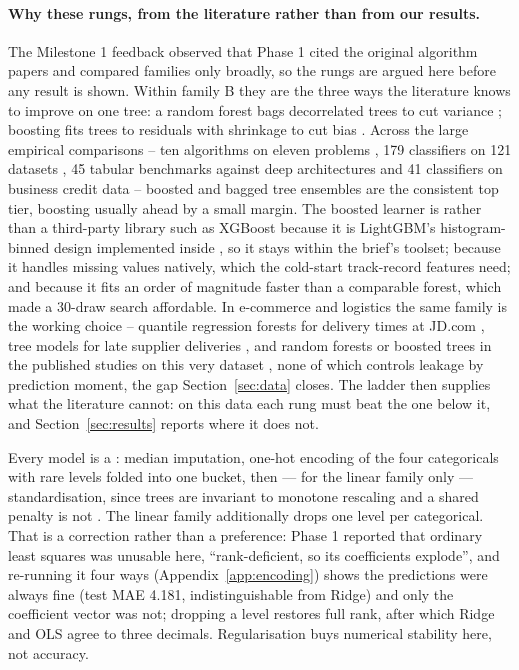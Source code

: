 \paragraph{Why these rungs, from the literature rather than from our results.}
The Milestone 1 feedback observed that Phase 1 cited the original algorithm
papers and compared families only broadly, so the rungs are argued here before
any result is shown. Within family B they are the three ways the literature
knows to improve on one tree: a random forest bags decorrelated trees to cut
variance \citep{breiman2001rf}; boosting fits trees to residuals with shrinkage
to cut bias \citep{friedman2001gbm}. Across the large empirical comparisons --
ten algorithms on eleven problems \citep{caruana2006empirical}, 179 classifiers
on 121 datasets \citep{fernandezdelgado2014hundreds}, 45 tabular benchmarks
against deep architectures \citep{grinsztajn2022tabular, shwartzziv2022tabular}
and 41 classifiers on business credit data \citep{lessmann2015benchmarking} --
boosted and bagged tree ensembles are the consistent top tier, boosting usually
ahead by a small margin. The boosted learner is 
rather than a third-party library such as XGBoost \citep{chen2016xgboost}
because it is LightGBM's histogram-binned design \citep{ke2017lightgbm}
implemented inside 
\citep{sklearn2024hgb}, so it stays within the brief's toolset; because it
handles missing values natively, which the cold-start track-record features
need; and because it fits an order of magnitude faster than a comparable
forest, which made a 30-draw search affordable. In e-commerce and logistics the
same family is the working choice -- quantile regression forests for delivery
times at JD.com \citep{salari2022delivery}, tree models for late supplier
deliveries \citep{baryannis2019risk}, and random forests or boosted trees in
the published studies on this very dataset \citep{fouad2023satisfaction,
wangkiat2023satisfaction, gopinadh2025satisfaction}, none of which controls
leakage by prediction moment, the gap Section~\ref{sec:data} closes. The ladder
then supplies what the literature cannot: on this data each rung must beat the
one below it, and Section~\ref{sec:results} reports where it does not.

Every model is a  : median imputation, one-hot
encoding of the four categoricals with rare levels folded into one bucket, then
--- for the linear family only --- standardisation, since trees are invariant to
monotone rescaling and a shared penalty is not \citep{pedregosa2011sklearn}. The
linear family additionally drops one level per categorical. That is a
correction rather than a preference: Phase 1 reported that ordinary least
squares was unusable here, ``rank-deficient, so its coefficients explode'', and
re-running it four ways (Appendix~\ref{app:encoding}) shows the predictions were
always fine (test MAE 4.181, indistinguishable from Ridge) and only the
coefficient vector was not; dropping a level restores full rank, after which
Ridge and OLS agree to three decimals. Regularisation buys numerical stability
here, not accuracy.

